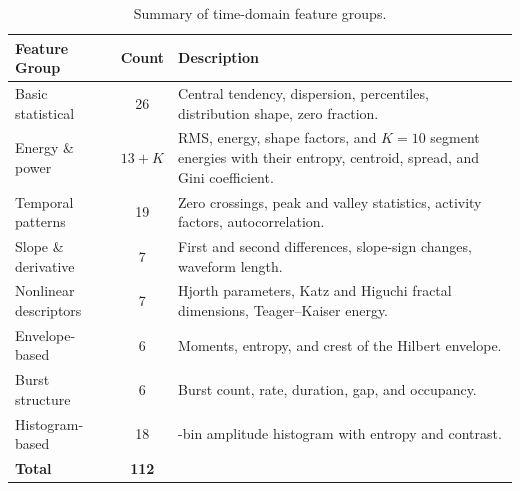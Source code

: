 \begin{table}[!htb]
	\centering
	\caption{Summary of time-domain feature groups.}
	\label{tab:timefeatures}
	\small
	\setlength{\tabcolsep}{4pt}
	\renewcommand{\arraystretch}{0.95}
	\begin{tabularx}{\textwidth}{@{}>{\raggedright\arraybackslash}p{3.1cm} c >{\raggedright\arraybackslash}X@{}}
		\toprule
		\textbf{Feature Group} & \textbf{Count} & \textbf{Description}\\
		\midrule
		Basic statistical   & 26       & Central tendency, dispersion, percentiles, distribution shape, zero fraction.\\
		Energy \& power     & $13 + K$ & RMS, energy, shape factors, and $K = 10$ segment energies with their entropy, centroid, spread, and Gini coefficient.\\
		Temporal patterns   & 19       & Zero crossings, peak and valley statistics, activity factors, autocorrelation.\\
		Slope \& derivative & 7        & First and second differences, slope-sign changes, waveform length.\\
		Nonlinear descriptors & 7      & Hjorth parameters, Katz and Higuchi fractal dimensions, Teager--Kaiser energy.\\
		Envelope-based      & 6        & Moments, entropy, and crest of the Hilbert envelope.\\
		Burst structure     & 6        & Burst count, rate, duration, gap, and occupancy.\\
		Histogram-based     & 18       & 16-bin amplitude histogram with entropy and contrast.\\
		\midrule
		\textbf{Total}      & \textbf{112} & \\
		\bottomrule
	\end{tabularx}
\end{table}

